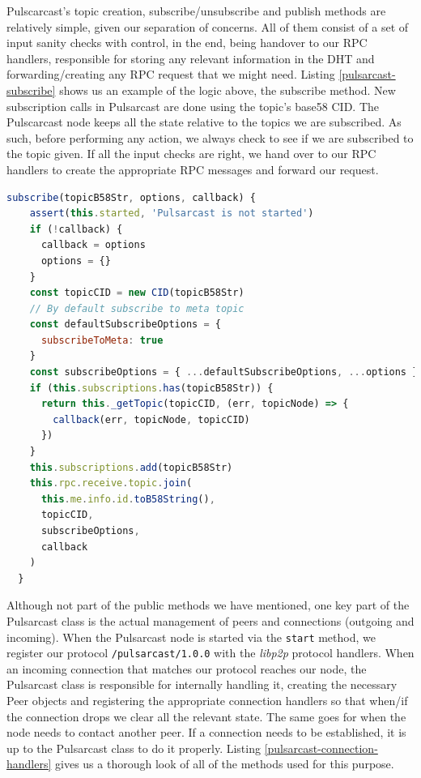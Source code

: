 Pulscarcast's topic creation, subscribe/unsubscribe and publish methods are
relatively simple, given our separation of concerns. All of them consist of a
set of input sanity checks with control, in the end, being handover to our RPC
handlers, responsible for storing any relevant information in the DHT and
forwarding/creating any RPC request that we might need. Listing
\ref{pulsarcast-subscribe} shows us an example of the logic above, the
subscribe method. New subscription calls in Pulsarcast are done using the
topic's base58 CID. The Pulscarcast node keeps all the state relative to the
topics we are subscribed. As such, before performing any action, we always
check to see if we are subscribed to the topic given. If all the input checks
are right, we hand over to our RPC handlers to create the appropriate RPC
messages and forward our request.

\begin{lstlisting}[language=JavaScript, float, caption={Pulsarcast class subscribe method},label={pulsarcast-subscribe}]
  subscribe(topicB58Str, options, callback) {
    assert(this.started, 'Pulsarcast is not started')
    if (!callback) {
      callback = options
      options = {}
    }
    const topicCID = new CID(topicB58Str)
    // By default subscribe to meta topic
    const defaultSubscribeOptions = {
      subscribeToMeta: true
    }
    const subscribeOptions = { ...defaultSubscribeOptions, ...options }
    if (this.subscriptions.has(topicB58Str)) {
      return this._getTopic(topicCID, (err, topicNode) => {
        callback(err, topicNode, topicCID)
      })
    }
    this.subscriptions.add(topicB58Str)
    this.rpc.receive.topic.join(
      this.me.info.id.toB58String(),
      topicCID,
      subscribeOptions,
      callback
    )
  }
\end{lstlisting}

Although not part of the public methods we have mentioned, one key part of the
Pulsarcast class is the actual management of peers and connections (outgoing
and incoming). When the Pulsarcast node is started via the \verb|start| method,
we register our protocol \verb|/pulsarcast/1.0.0| with the \emph{libp2p}
protocol handlers. When an incoming connection that matches our protocol
reaches our node, the Pulsarcast class is responsible for internally handling
it, creating the necessary Peer objects and registering the appropriate
connection handlers so that when/if the connection drops we clear all the
relevant state. The same goes for when the node needs to contact another peer.
If a connection needs to be established, it is up to the Pulsarcast class to do
it properly. Listing \ref{pulsarcast-connection-handlers} gives us a thorough
look of all of the methods used for this purpose.

